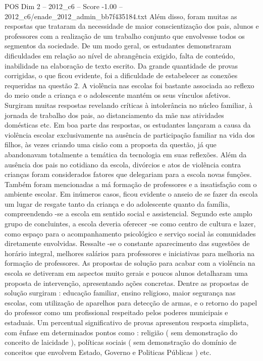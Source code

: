 \begin{textsample}{POS Dim 2 – 2012\_c6 – Score -1.00 – 2012\_c6/enade\_2012\_admin\_bb7f435184.txt}
Além disso, foram muitas as respostas que trataram da necessidade de maior conscientização dos pais, alunos e professores com a realização de um trabalho conjunto que envolvesse todos os segmentos da sociedade.
De um modo geral, os estudantes demonstraram dificuldades em relação ao nível de abrangência exigido, falta de conteúdo, inabilidade na elaboração de texto escrito.
Da grande quantidade de provas corrigidas, o que ficou evidente, foi a dificuldade de estabelecer as conexões requeridas na questão 2.
A violência nas escolas foi bastante associada ao reflexo do meio onde a criança e o adolescente mantém os seus vínculos afetivos.
Surgiram muitas respostas revelando críticas à intolerância no núcleo familiar, à jornada de trabalho dos pais, ao distanciamento da mãe nas atividades domésticas etc.
Em boa parte das respostas, os estudantes lançaram a causa da violência escolar exclusivamente na ausência de participação familiar na vida dos filhos, às vezes criando uma cisão com a proposta da questão, já que abandonavam totalmente a temática da tecnologia em suas reflexões.
Além da ausência dos pais no cotidiano da escola, divórcios e atos de violência contra crianças foram considerados fatores que delegariam para a escola novas funções.
Também foram mencionadas a má formação de professores e a insatisfação com o ambiente escolar.
Em inúmeros casos, ficou evidente o anseio de se fazer da escola um lugar de resgate tanto da criança e do adolescente quanto da família, compreendendo -se a escola em sentido social e assistencial.
Segundo este amplo grupo de concluintes, a escola deveria oferecer -se como centro de cultura e lazer, como espaço para o acompanhamento psicológico e serviço social às comunidades diretamente envolvidas.
Ressalte -se o constante aparecimento das sugestões de horário integral, melhores salários para professores e iniciativas para melhoria na formação de professores.
As propostas de solução para acabar com a violência na escola se detiveram em aspectos muito gerais e poucos alunos detalharam uma proposta de intervenção, apresentando ações concretas.
Dentre as propostas de solução surgiram : educação familiar, ensino religioso, maior segurança nas escolas, com utilização de aparelhos para detecção de armas, e o retorno do papel do professor como um profissional respeitado pelos poderes municipais e estaduais.
Um percentual significativo de provas apresentou resposta simplista, com ênfase em determinados pontos como : religião ( sem demonstração do conceito de laicidade ), políticas sociais ( sem demonstração do domínio de conceitos que envolvem Estado, Governo e Politicas Públicas ) etc.

\end{textsample}
